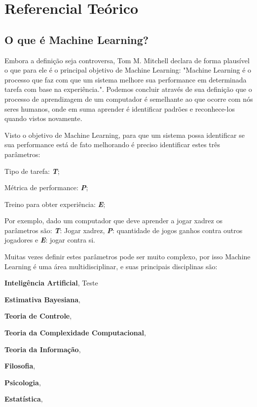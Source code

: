 \chapter{Referencial Teórico}
\label{cap:referencial-reorico}

\section{O que é Machine Learning?}
\label{sec:oqueemachinelearning}

Embora a definição seja controversa, Tom M. Mitchell declara de forma plausível o que para ele é o principal objetivo de Machine Learning: "Machine Learning é o processo que faz com que um sistema melhore sua performance em determinada tarefa com base na experiência."\cite{Tom}. Podemos concluir através de sua definição que o processo de aprendizagem de um computador é semelhante ao que ocorre com nós seres humanos, onde em suma aprender é identificar padrões e reconhece-los quando vistos novamente.

Visto o objetivo de Machine Learning, para que um sistema possa identificar se sua performance está de fato melhorando é preciso identificar estes três parâmetros:
 \begin{alineascomponto}
	\item Tipo de tarefa: \textbf{\textit{T}};
	\item Métrica de performance: \textbf{\textit{P}};
	\item Treino para obter experiência: \textbf{\textit{E}};			
\end{alineascomponto}
Por exemplo, dado um computador que deve aprender a jogar xadrez os parâmetros são: \textbf{\textit{T}}: Jogar xadrez, \textbf{\textit{P}}: quantidade de jogos ganhos contra outros jogadores e
\textbf{\textit{E}}: jogar contra si.

Muitas vezes definir estes parâmetros pode ser muito complexo, por isso Machine Learning é uma área multidisciplinar, e suas principais disciplinas são: 
 
 \begin{alineascomponto}
	\item \textbf{Inteligência Artificial}, Teste 
	\item \textbf{Estimativa Bayesiana}, 
	\item \textbf{Teoria de Controle}, 
	\item \textbf{Teoria da Complexidade Computacional}, 
	\item \textbf{Teoria da Informação}, 
	\item \textbf{Filosofia}, 
	\item \textbf{Psicologia}, 
	\item \textbf{Estatística}, 
\end{alineascomponto}